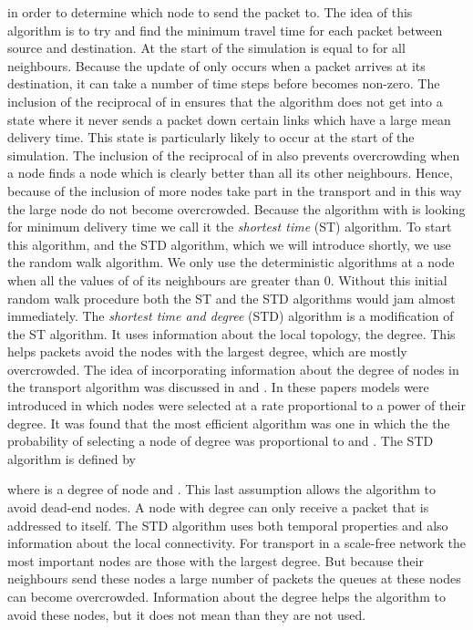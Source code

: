 \documentclass[runningheads]{llncs}
\begin{document}
in order to determine which node to send the packet to. The idea of
this algorithm is to try and find the minimum travel time for each
packet between source and destination. At the start of the
simulation  is equal to  for all neighbours.  Because the
update of  only occurs when a packet arrives at its
destination, it can take a number of time steps before  becomes non-zero. The inclusion of the reciprocal of  in  ensures that the algorithm does not get into a state
where it never sends a packet down certain links which have a large
mean delivery time. This state is particularly likely to occur at
the start of the simulation. The inclusion of the reciprocal of
 in  also prevents overcrowding when a node finds a
node which is clearly better than all its other neighbours. Hence,
because of the inclusion of  more nodes take part in
the transport and in this way the large node do not become
overcrowded. Because the algorithm with  is looking
for minimum delivery time we call it the \emph{shortest time} (ST)
algorithm. To start this algorithm, and the STD algorithm, which we
will introduce shortly, we use the random walk algorithm. We only
use the deterministic algorithms at a node when all the values of
 of its neighbours are greater than 0. Without this initial
random walk procedure both the ST and the STD algorithms would jam
almost immediately. The \emph{shortest time and degree} (STD)
algorithm is a modification of the ST algorithm. It uses information
about the local topology, the degree. This helps packets avoid the
nodes with the largest degree, which are mostly overcrowded. The
idea of incorporating information about the degree of nodes in the
transport algorithm was discussed in \cite{Yan} and \cite{Wang}. In
these papers models were introduced in which nodes were selected at
a rate proportional to a power of their degree. It was found that
the most efficient algorithm was one in which the the probability of
selecting a node of degree  was proportional to   \cite{Yan}
and \cite{Wang}. The STD algorithm is defined by

where  is a degree of node  and . This last
assumption allows the algorithm to avoid dead-end nodes. A node with
degree  can only receive a packet that is addressed to itself.
The STD algorithm uses both temporal properties and also information
about the local connectivity. For transport in a scale-free network
the most important nodes are those with the largest degree. But
because their neighbours send these nodes a large number of packets
the queues at these nodes can become overcrowded. Information about
the degree helps the algorithm to avoid these nodes, but it does not
mean than they are not used.
\end{document}
